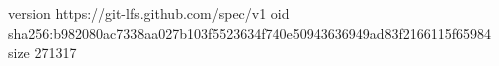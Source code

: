 version https://git-lfs.github.com/spec/v1
oid sha256:b982080ac7338aa027b103f5523634f740e50943636949ad83f2166115f65984
size 271317
